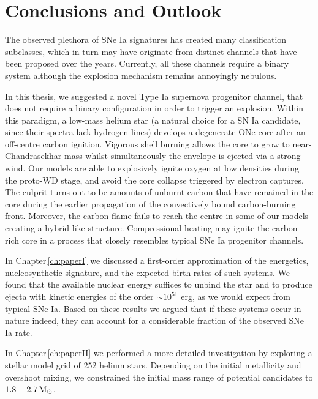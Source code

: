 \documentclass[../../main/thesis_msc.tex]{subfiles}
\begin{document}
\chapter{Conclusions and Outlook}
	
		The observed plethora of SNe Ia signatures has created many classification subclasses, which in turn may have originate from distinct channels that have been proposed over the years. Currently, all these channels require a binary system although the explosion mechanism remains annoyingly nebulous. 


		In this thesis, we suggested a novel Type Ia supernova progenitor channel, that does not require a binary configuration in order to trigger an explosion. Within this paradigm, a low-mass helium star (a natural choice for a SN Ia candidate, since their spectra lack hydrogen lines) develops a degenerate ONe core after an off-centre carbon ignition. Vigorous shell burning allows the core to grow to near-Chandrasekhar mass whilst simultaneously the envelope is ejected via a strong wind. Our models are able to explosively ignite oxygen at low densities during the proto-WD stage, and avoid the core collapse triggered by electron captures. The culprit turns out to be amounts of unburnt carbon that have remained in the core during the earlier propagation of the convectively bound carbon-burning front.
		Moreover, the carbon flame fails to reach the centre in some of our models creating a hybrid-like structure. Compressional heating may ignite the carbon-rich core in a process that closely resembles typical SNe Ia progenitor channels.
		
		
		In Chapter\,\ref{ch:paperI} we discussed a first-order approximation of the energetics, nucleosynthetic signature, and the expected birth rates of such systems. We found that the available nuclear energy suffices to unbind the star and to produce ejecta with kinetic energies of the order $\sim 10^{51}$ erg, as we would expect from typical SNe Ia. Based on these results we argued that if these systems occur in nature indeed, they can account for a considerable fraction of the observed SNe Ia rate.
		
		In Chapter\,\ref{ch:paperII} we performed a more detailed investigation by exploring a stellar model grid of 252 helium stars. Depending on the initial metallicity and overshoot mixing, we constrained the initial mass range of potential candidates to $\rm 1.8 - 2.7\, M_{\odot}$.
		
		
		
\end{document}
